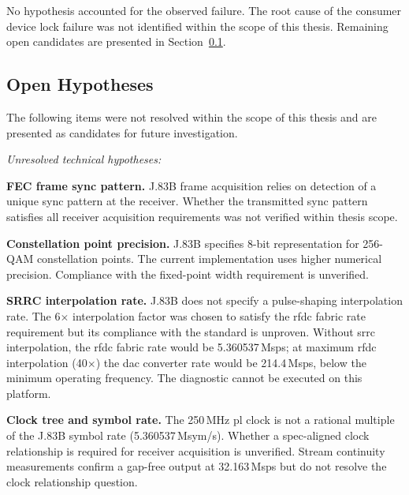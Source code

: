 \FloatBarrier

No hypothesis accounted for the observed failure.
The root cause of the consumer device lock failure was not
identified within the scope of this thesis.
Remaining open candidates are presented in
Section~\ref{subsec:open_hypotheses}.

\subsection{Open Hypotheses}
\label{subsec:open_hypotheses}

The following items were not resolved within the scope of this
thesis and are presented as candidates for future investigation.

\textit{Unresolved technical hypotheses:}
\begin{tightemize}

  \item \textbf{FEC frame sync pattern.}
        J.83B frame acquisition relies on detection of a unique
        sync pattern at the receiver.
        Whether the transmitted sync pattern satisfies all receiver
        acquisition requirements was not verified within thesis scope.

  \item \textbf{Constellation point precision.}
        J.83B specifies 8-bit representation for 256-QAM constellation
        points.
        The current implementation uses higher numerical precision.
        Compliance with the fixed-point width requirement is unverified.

  \item \textbf{SRRC interpolation rate.}
        J.83B does not specify a pulse-shaping interpolation rate.
        The 6$\times$ interpolation factor was chosen to satisfy the
        \ac{rfdc} fabric rate requirement but its compliance with the
        standard is unproven.
        Without \ac{srrc} interpolation, the \ac{rfdc} fabric rate would
        be 5.360537\,Msps; at maximum \ac{rfdc} interpolation (40$\times$)
        the \ac{dac} converter rate would be 214.4\,Msps, below the
        minimum operating frequency.
        The diagnostic cannot be executed on this platform.

  \item \textbf{Clock tree and symbol rate.}
        The 250\,MHz \ac{pl} clock is not a rational multiple of the
        J.83B symbol rate (5.360537\,Msym/s).
        Whether a spec-aligned clock relationship is required for
        receiver acquisition is unverified.
        Stream continuity measurements confirm a gap-free output at
        32.163\,Msps but do not resolve the clock relationship question.


\end{tightemize}
